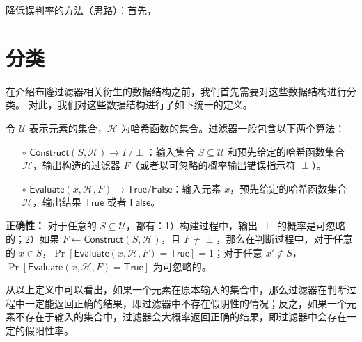 降低误判率的方法（思路）：首先，

\section{分类}

在介绍布隆过滤器相关衍生的数据结构之前，我们首先需要对这些数据结构进行分类。
对此，我们对这些数据结构进行了如下统一的定义。

\begin{definition}\label{def:filter}
    令 $\mathcal{U}$ 表示元素的集合，$\mathcal{H}$ 为哈希函数的集合。过滤器一般包含以下两个算法：
    \begin{itemize}
    \item[$\circ$] $\mathsf{Construct}(S, \mathcal{H}) \to F/\perp$：输入集合 $S \subseteq \mathcal{U}$ 和预先给定的哈希函数集合 $\mathcal{H}$，输出构造的过滤器 $F$（或者以可忽略的概率输出错误指示符 $\perp$）。
    \item[$\circ$] $\mathsf{Evaluate}(x, \mathcal{H}, F) \to \mathsf{True} / \mathsf{False} $：输入元素 $x$，预先给定的哈希函数集合 $\mathcal{H}$，输出结果 $\mathsf{True}$ 或者 $\mathsf{False}$。
    \end{itemize}
\end{definition}

\textbf{正确性：} 对于任意的 $S \subseteq \mathcal{U}$，都有：1）构建过程中，输出 $\perp$ 的概率是可忽略的；2）如果 $F \gets \mathsf{Construct}(S, \mathcal{H})$，且 $F \neq \perp$，那么在判断过程中，对于任意的 $x \in S$，$\Pr[\mathsf{Evaluate}(x, \mathcal{H}, F) = \mathsf{True}] = 1$；对于任意 $x' \notin S$，$\Pr[\mathsf{Evaluate}(x, \mathcal{H}, F) = \mathsf{True}]$ 为可忽略的。

从以上定义中可以看出，如果一个元素在原本输入的集合中，那么过滤器在判断过程中一定能返回正确的结果，即过滤器中不存在假阴性的情况；反之，如果一个元素不存在于输入的集合中，过滤器会大概率返回正确的结果，即过滤器中会存在一定的假阳性率。


